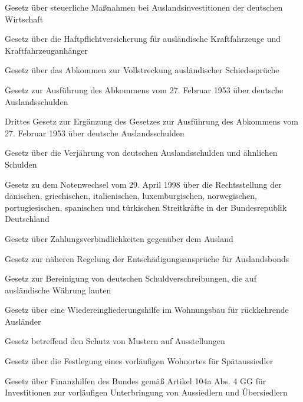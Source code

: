 \item[{AuslInvG}] Gesetz über steuerliche Maßnahmen bei Auslandsinvestitionen der deutschen Wirtschaft

\item[{AuslPflVG}] Gesetz über die Haftpflichtversicherung für ausländische Kraftfahrzeuge und Kraftfahrzeuganhänger

\item[{AuslSchSprAbkG}] Gesetz über das Abkommen zur Vollstreckung ausländischer Schiedssprüche

\item[{AuslSchuldAbkAG}] Gesetz zur Ausführung des Abkommens vom 27. Februar 1953 über deutsche Auslandsschulden

\item[{AuslSchuldAbkAGErG-3}] Drittes Gesetz zur Ergänzung des Gesetzes zur Ausführung des Abkommens vom 27. Februar 1953 über deutsche Auslandsschulden

\item[{AuslSchuldVerjG}] Gesetz über die Verjährung von deutschen Auslandsschulden und ähnlichen Schulden

\item[{AuslStreitkrNotWG}] Gesetz zu dem Notenwechsel vom 29. April 1998 über die Rechtsstellung der dänischen, griechischen, italienischen, luxemburgischen, norwegischen, portugiesischen, spanischen und türkischen Streitkräfte in der Bundesrepublik Deutschland

\item[{AuslVerbindlG}] Gesetz über Zahlungsverbindlichkeiten gegenüber dem Ausland

\item[{AuslWBEntschG}] Gesetz zur näheren Regelung der Entschädigungsansprüche für Auslandsbonds

\item[{AuslWBG}] Gesetz zur Bereinigung von deutschen Schuldverschreibungen, die auf ausländische Währung lauten

\item[{AuslWoBauG}] Gesetz über eine Wiedereingliederungshilfe im Wohnungsbau für rückkehrende Ausländer

\item[{AusstG}] Gesetz betreffend den Schutz von Mustern auf Ausstellungen

\item[{AusÜbsiedWOG}] Gesetz über die Festlegung eines vorläufigen Wohnortes für Spätaussiedler

\item[{AusÜbsInvFHG}] Gesetz über Finanzhilfen des Bundes gemäß Artikel 104a Abs. 4 GG für Investitionen zur vorläufigen Unterbringung von Aussiedlern und Übersiedlern

